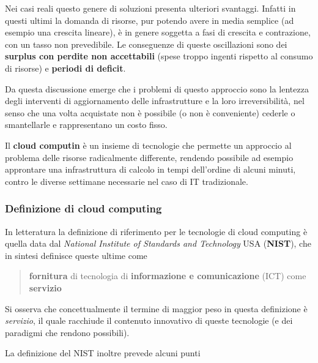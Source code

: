 \documentclass[italian,]{article}
\begin{document}
Nei casi reali questo genere di soluzioni presenta ulteriori svantaggi.
Infatti in questi ultimi la domanda di risorse, pur potendo avere in
media semplice (ad esempio una crescita lineare), è in genere soggetta a
fasi di crescita e contrazione, con un tasso non prevedibile. Le
conseguenze di queste oscillazioni sono dei \textbf{surplus con perdite
non accettabili} (spese troppo ingenti rispetto al consumo di risorse) e
\textbf{periodi di deficit}.

Da questa discussione emerge che i problemi di questo approccio sono la
lentezza degli interventi di aggiornamento delle infrastrutture e la
loro irreversibilità, nel senso che una volta acquistate non è possibile
(o non è conveniente) cederle o smantellarle e rappresentano un costo
fisso.

Il \textbf{cloud computin} è un insieme di tecnologie che permette un
approccio al problema delle risorse radicalmente differente, rendendo
possibile ad esempio approntare una infrastruttura di calcolo in tempi
dell'ordine di alcuni minuti, contro le diverse settimane necessarie nel
caso di IT tradizionale.

\subsubsection{Definizione di cloud
computing}\label{definizione-di-cloud-computing}

In letteratura la definizione di riferimento per le tecnologie di cloud
computing è quella data dal \emph{National Institute of Standards and
Technology} USA (\textbf{NIST}), che in sintesi definisce queste ultime
come

\begin{quote}
\textbf{fornitura} di tecnologia di \textbf{informazione e
comunicazione} (ICT) come \textbf{servizio}
\end{quote}

Si osserva che concettualmente il termine di maggior peso in questa
definizione è \emph{servizio}, il quale racchiude il contenuto
innovativo di queste tecnologie (e dei paradigmi che rendono possibili).

La definizione del NIST inoltre prevede alcuni punti
\end{document}

